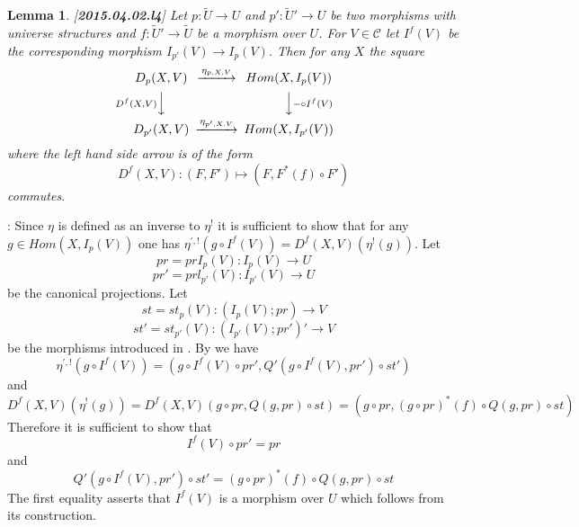 \documentclass[12pt]{article}
\newenvironment{myproof}{{\bf Proof}:}{\vskip 5mm }
\newtheorem{lemma}[proposition]{Lemma}
\newcommand{\llabel}[1]{\label{#1}[{\bf #1}]}
\newcommand{\sr}{\rightarrow}
\newcommand{\wt}{\widetilde}
\begin{document}
%
%
\begin{lemma}
\llabel{2015.04.02.l4}
Let $p:\wt{U}\sr U$ and $p':\wt{U}'\sr U$ be two morphisms with universe structures and $f:\wt{U}'\sr \wt{U}$ be a morphism over $U$. For $V\in {\mathcal C}$ let $I^f(V)$ be the corresponding morphism $I_{p'}(V)\sr I_p(V)$. Then for any $X$ the square
%
$$
\begin{CD}
D_p(X,V) @>\eta_{p,X,V}>> Hom(X, I_p(V))\\
@V{D^f(X,V)}VV @VV{-\circ I^f(V)} V\\
D_{p'}(X,V) @>\eta_{p',X.V}>> Hom (X, I_{p'}(V))
\end{CD}
$$
%
where the left hand side arrow is of the form 
%
$$D^f(X,V):(F, F')\mapsto (F,F^*(f)\circ F')$$
%
commutes.
\end{lemma}
%
\begin{myproof}
Since $\eta$ is defined as an inverse to $\eta^!$ it is sufficient to show that for any $g\in Hom(X,I_p(V))$ one has $\eta^{',!}(g\circ I^f(V))=D^f(X,V)(\eta^!(g))$. Let
%
$$pr=prI_p(V):I_p(V)\sr U$$
$$pr'=prl_{p'}(V):I_{p'}(V)\sr U$$
%
be the canonical projections. Let
%
$$st=st_p(V):(I_p(V);pr)\sr V$$
$$st'=st_{p'}(V):(I_{p'}(V);pr')'\sr V$$
%
be the morphisms introduced in \cite{fromunivwithPi}. By \cite[Construction 3.9]{fromunivwithPi} we have
%
$$\eta^{',!}(g\circ I^f(V))=(g\circ I^f(V)\circ pr', Q'(g\circ I^f(V), pr')\circ st')$$
%
and
%
$$D^f(X,V)(\eta^!(g))=D^f(X,V)(g\circ pr, Q(g,pr)\circ st)=(g\circ pr, (g\circ pr)^*(f)\circ Q(g,pr)\circ st)$$
%
Therefore it is sufficient to show that
%
$$I^f(V)\circ pr'=pr$$
%
and
%
$$Q'(g\circ I^f(V), pr')\circ st'=(g\circ pr)^*(f)\circ Q(g,pr)\circ st$$
%
The first equality asserts that $I^f(V)$ is a morphism over $U$ which follows from its construction. 


\end{myproof}
\end{document}
